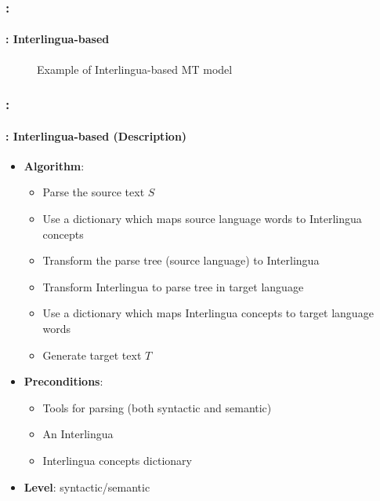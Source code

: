 \documentclass[xcolor=table]{beamer}
\begin{document}
\begin{frame}
	\frametitle{\insertshortsubtitle: \insertsection}
	\framesubtitle{\insertsubsection: Interlingua-based}
	
	\begin{figure}
		\centering
		\caption{Example of Interlingua-based MT model \cite{06-quah}}
	\end{figure}

\end{frame}

\begin{frame}
	\frametitle{\insertshortsubtitle: \insertsection}
	\framesubtitle{\insertsubsection: Interlingua-based (Description)}
	
	\begin{itemize}
		\item \textbf{Algorithm}:
		\begin{itemize}
			\item Parse the source text $S$
			\item Use a dictionary which maps source language words to Interlingua concepts 
			\item Transform the parse tree (source language) to Interlingua
			\item Transform Interlingua to parse tree in target language
			\item Use a dictionary which maps Interlingua concepts to target language words 
			\item Generate target text $T$
		\end{itemize}
		\item \textbf{Preconditions}:
		\begin{itemize}
			\item Tools for parsing (both syntactic and semantic)
			\item An Interlingua
			\item Interlingua concepts dictionary
		\end{itemize}
		\item \textbf{Level}: syntactic/semantic
	\end{itemize}

\end{frame}
\end{document}
